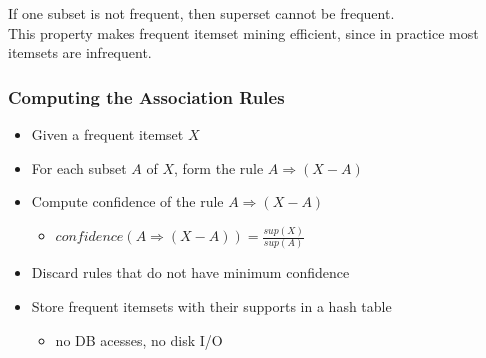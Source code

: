 \documentclass[../notes.tex]{subfiles}
\begin{document}
If one subset is not frequent, then superset cannot be frequent. \\
This property makes frequent itemset mining efficient, since in practice most itemsets are infrequent. 

\subsubsection{Computing the Association Rules}
\begin{itemize}
  \item Given a frequent itemset $X$
  \item For each subset $A$ of $X$, form the rule $A \Rightarrow (X - A)$
  \item Compute confidence of the rule $A \Rightarrow (X - A)$
    \begin{itemize}
      \item $confidence(A \Rightarrow (X - A)) = \frac{sup(X)}{sup(A)}$ 
    \end{itemize}
  \item Discard rules that do not have minimum confidence
  \item Store frequent itemsets with their supports in a hash table
    \begin{itemize}
      \item no DB acesses, no disk I/O
    \end{itemize}
\end{itemize}
\end{document}
